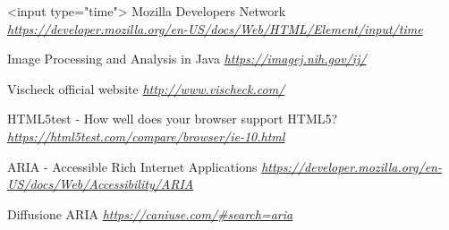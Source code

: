 \documentclass[10pt, a4paper]{article}
\begin{document}
\begin{thebibliography}{9}
	
	<input type="time"> Mozilla Developers Network
	\textit{\url{https://developer.mozilla.org/en-US/docs/Web/HTML/Element/input/time}}
	
	Image Processing and Analysis in Java
	\textit{\url{https://imagej.nih.gov/ij/}}
	
	Vischeck official website
	\textit{\url{http://www.vischeck.com/}}
	
	HTML5test - How well does your browser support HTML5?
	\textit{\url{https://html5test.com/compare/browser/ie-10.html}}
	
	ARIA - Accessible Rich Internet Applications
	\textit{\url{https://developer.mozilla.org/en-US/docs/Web/Accessibility/ARIA}}

	Diffusione ARIA
	\textit{\url{https://caniuse.com/\#search=aria}}
\end{thebibliography}
\end{document}
